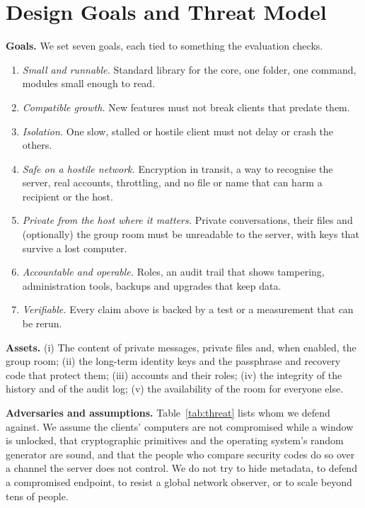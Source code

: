 \documentclass[conference]{IEEEtran}
\begin{document}
\section{Design Goals and Threat Model}\label{sec:goals}
\textbf{Goals.} We set seven goals, each tied to something the evaluation checks.
\begin{enumerate}
  \item[G1] \emph{Small and runnable.} Standard library for the core, one folder, one command, modules small enough to read.
  \item[G2] \emph{Compatible growth.} New features must not break clients that predate them.
  \item[G3] \emph{Isolation.} One slow, stalled or hostile client must not delay or crash the others.
  \item[G4] \emph{Safe on a hostile network.} Encryption in transit, a way to recognise the server, real accounts, throttling, and no file or name that can harm a recipient or the host.
  \item[G5] \emph{Private from the host where it matters.} Private conversations, their files and (optionally) the group room must be unreadable to the server, with keys that survive a lost computer.
  \item[G6] \emph{Accountable and operable.} Roles, an audit trail that shows tampering, administration tools, backups and upgrades that keep data.
  \item[G7] \emph{Verifiable.} Every claim above is backed by a test or a measurement that can be rerun.
\end{enumerate}

\textbf{Assets.} (i) The content of private messages, private files and, when enabled, the group room; (ii) the long-term identity keys and the passphrase and recovery code that protect them; (iii) accounts and their roles; (iv) the integrity of the history and of the audit log; (v) the availability of the room for everyone else.

\textbf{Adversaries and assumptions.} Table~\ref{tab:threat} lists whom we defend against. We assume the clients' computers are not compromised while a window is unlocked, that cryptographic primitives and the operating system's random generator are sound, and that the people who compare security codes do so over a channel the server does not control. We do not try to hide metadata, to defend a compromised endpoint, to resist a global network observer, or to scale beyond tens of people.
\end{document}
